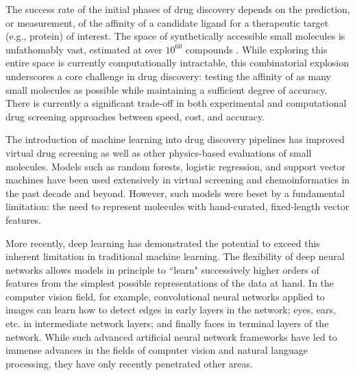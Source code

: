 The success rate of the initial phases of drug discovery depends on the prediction, or measurement, of the affinity of a candidate ligand for a therapeutic target (e.g., protein) of interest. The space of synthetically accessible small molecules is unfathomably vast, estimated at over $10^{60}$ compounds \cite{virshup2013stochastic}. While exploring this entire space is currently computationally intractable, this combinatorial explosion underscores a core challenge in drug discovery: testing the affinity of as many small molecules as possible while maintaining a sufficient degree of accuracy. There is currently a significant trade-off in both experimental and computational drug screening approaches between speed, cost, and accuracy.\cite{dragiev2011systematic, wang2015accurate, trott2010autodock}

The introduction of machine learning into drug discovery pipelines has improved virtual drug screening as well as other physics-based evaluations of small molecules. Models such as random forests, logistic regression, and support vector machines \cite{svetnik2003random} have been used  extensively in virtual screening and chemoinformatics in the past decade and beyond. However, such models were beset by a fundamental limitation: the need to represent molecules with hand-curated, fixed-length vector features.

More recently, deep learning has demonstrated the potential to exceed this inherent limitation in traditional machine learning. The flexibility of deep neural networks allows models in principle to ``learn" successively higher orders of features from the simplest possible representations of the data at hand. In the computer vision field, for example, convolutional neural networks \cite{krizhevsky2012imagenet} applied to images can learn how to detect edges in early layers in the network; eyes, ears, etc. in intermediate network layers; and finally faces in terminal layers of the network. While such advanced artificial neural network frameworks have led to immense advances in the fields of computer vision and natural language processing, they have only recently penetrated other areas. 

